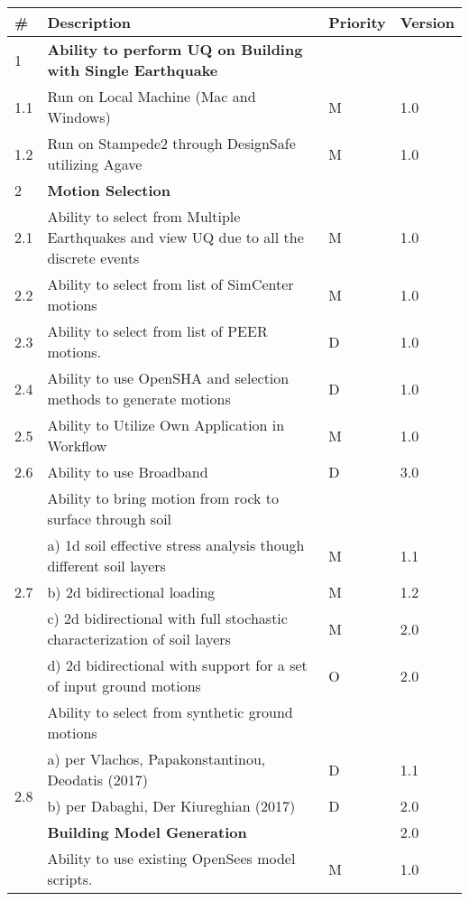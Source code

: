 \newpage

\begin{longtable}{| p{} | p{} | p{} | p{} |}
    \toprule
      \# & Description & Priority & Version \\ \hline
      1 & \textbf{Ability to perform UQ on Building with Single Earthquake} &  &  \\ 
	1.1 & Run on Local Machine (Mac and Windows) & M & 1.0 \\ \hline
	1.2 & Run on Stampede2 through DesignSafe utilizing Agave & M & 1.0 \\ \hline
	2 & \textbf{Motion Selection} &  &  \\ \hline
	2.1 & Ability to select from Multiple Earthquakes and view UQ due to all the discrete events & M & 1.0  \\ \hline
	2.2 & Ability to select from list of SimCenter motions & M & 1.0 \\ \hline
	2.3 & Ability to select from list of PEER motions. & D & 1.0 \\ \hline
	2.4 & Ability to use OpenSHA and selection methods to generate motions & D & 1.0 \\ \hline
	2.5 & Ability to Utilize Own Application in Workflow & M & 1.0 \\ \hline
	2.6 & Ability to use Broadband & D & 3.0 \\ \hline
	\multirow{5}{*}{2.7} 
	& Ability to bring motion from rock to surface through soil &  &  \\ 
	 & a)     1d soil effective stress analysis though different soil layers & M & 1.1  \\ 
	 & b)     2d bidirectional loading & M & 1.2 \\ 
	 & c)     2d bidirectional with full stochastic characterization of soil layers & M & 2.0 \\
	 & d)     2d bidirectional with support for a set of input ground motions & O & 2.0 \\ 
	 \hline
	\multirow{5}{*}{2.8} 
	& Ability to select from synthetic ground motions &  &  \\
	 & a)     per Vlachos, Papakonstantinou, Deodatis (2017) & D & 1.1  \\ 
	 & b)     per Dabaghi, Der Kiureghian (2017) & D & 2.0 \\ \hline
	3 & \textbf{Building Model Generation} &  & 2.0 \\ \hline
	3.1 & Ability to use existing OpenSees model scripts. & M & 1.0 \\ \hline

\end{longtable}

